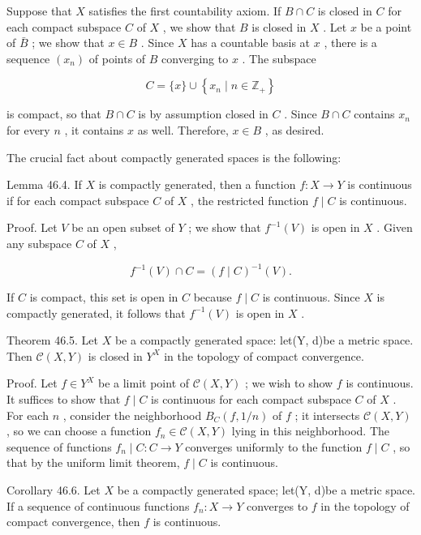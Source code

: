 Suppose that \(X\) satisfies the first countability axiom. If \(B \cap  C\) is closed in \(C\) for each compact subspace \(C\) of \(X\) , we show that \(B\) is closed in \(X\) . Let \(x\) be a point of \(\bar{B}\) ; we show that \(x \in  B\) . Since \(X\) has a countable basis at \(x\) , there is a sequence \(\left( {x}_{n}\right)\) of points of \(B\) converging to \(x\) . The subspace

\[
C = \{ x\}  \cup  \left\{  {{x}_{n} \mid  n \in  {\mathbb{Z}}_{ + }}\right\}
\]

is compact, so that \(B \cap  C\) is by assumption closed in \(C\) . Since \(B \cap  C\) contains \({x}_{n}\) for every \(n\) , it contains \(x\) as well. Therefore, \(x \in  B\) , as desired.

The crucial fact about compactly generated spaces is the following:

Lemma 46.4. If \(X\) is compactly generated, then a function \(f : X \rightarrow  Y\) is continuous if for each compact subspace \(C\) of \(X\) , the restricted function \(f \mid  C\) is continuous.

Proof. Let \(V\) be an open subset of \(Y\) ; we show that \({f}^{-1}\left( V\right)\) is open in \(X\) . Given any subspace \(C\) of \(X\) ,

\[
{f}^{-1}\left( V\right)  \cap  C = {\left( f \mid  C\right) }^{-1}\left( V\right) .
\]

If \(C\) is compact, this set is open in \(C\) because \(f \mid  C\) is continuous. Since \(X\) is compactly generated, it follows that \({f}^{-1}\left( V\right)\) is open in \(X\) .

Theorem 46.5. Let \(X\) be a compactly generated space: let(Y, d)be a metric space. Then \(\mathcal{C}\left( {X,Y}\right)\) is closed in \({Y}^{X}\) in the topology of compact convergence.

Proof. Let \(f \in  {Y}^{X}\) be a limit point of \(\mathcal{C}\left( {X,Y}\right)\) ; we wish to show \(f\) is continuous. It suffices to show that \(f \mid  C\) is continuous for each compact subspace \(C\) of \(X\) . For each \(n\) , consider the neighborhood \({B}_{C}\left( {f,1/n}\right)\) of \(f\) ; it intersects \(\mathcal{C}\left( {X,Y}\right)\) , so we can choose a function \({f}_{n} \in  \mathcal{C}\left( {X,Y}\right)\) lying in this neighborhood. The sequence of functions \({f}_{n} \mid  C : C \rightarrow  Y\) converges uniformly to the function \(f \mid  C\) , so that by the uniform limit theorem, \(f \mid  C\) is continuous.

Corollary 46.6. Let \(X\) be a compactly generated space; let(Y, d)be a metric space. If a sequence of continuous functions \({f}_{n} : X \rightarrow  Y\) converges to \(f\) in the topology of compact convergence, then \(f\) is continuous.

